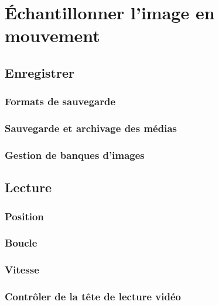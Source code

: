 \documentclass[
]{book}
\begin{document}
\hypertarget{echantillonner}{%
\chapter{Échantillonner l'image en mouvement}\label{echantillonner}}

\hypertarget{enregistrer}{%
\section{Enregistrer}\label{enregistrer}}

\hypertarget{formats-de-sauvegarde}{%
\subsection{Formats de sauvegarde}\label{formats-de-sauvegarde}}

\hypertarget{sauvegarde-et-archivage-des-muxe9dias}{%
\subsection{Sauvegarde et archivage des médias}\label{sauvegarde-et-archivage-des-muxe9dias}}

\hypertarget{gestion-de-banques-dimages}{%
\subsection{Gestion de banques d'images}\label{gestion-de-banques-dimages}}

\hypertarget{lecture}{%
\section{Lecture}\label{lecture}}

\hypertarget{position}{%
\subsection{Position}\label{position}}

\hypertarget{boucle}{%
\subsection{Boucle}\label{boucle}}

\hypertarget{vitesse}{%
\subsection{Vitesse}\label{vitesse}}

\hypertarget{contruxf4ler-de-la-tuxeate-de-lecture-viduxe9o}{%
\subsection{Contrôler de la tête de lecture vidéo}\label{contruxf4ler-de-la-tuxeate-de-lecture-viduxe9o}}
\end{document}
